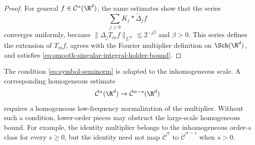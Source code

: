 \begin{proof}
  For general $f \in \mathcal{C}^{\alpha} (\R^d)$, the same estimates show
  that the series
  \[ \sum_{j \ge 0} K_j \ast \tilde{\Delta}_j f \]
  converges uniformly, because $\| \Delta_j T_m f\|_{L^{\infty}} \lesssim 2^{-
  j \beta}$ and $\beta > 0$. This series defines the extension of $T_m f$,
  agrees with the Fourier multiplier definition on $\Sch (\R^d)$, and
  satisfies \eqref{eq:smooth-singular-integral-holder-bound}.
\end{proof}

\begin{remark}
  \label{rmk:homogeneous-symbol-caveat}The condition
  \eqref{eq:symbol-seminorm} is adapted to the inhomogeneous scale. A
  corresponding homogeneous estimate
  \[ \dot{\mathcal{C}}^{\alpha} (\R^d) \to \dot{\mathcal{C}}^{\alpha - s}
     (\R^d) \]
  requires a homogeneous low-frequency normalization of the multiplier.
  Without such a condition, lower-order pieces may obstruct the large-scale
  homogeneous bound. For example, the identity multiplier belongs to the
  inhomogeneous order-$s$ class for every $s \ge 0$, but the identity need not
  map $\dot{\mathcal{C}}^{\alpha}$ to $\dot{\mathcal{C}}^{\alpha - s}$ when $s
  > 0$.
\end{remark}
